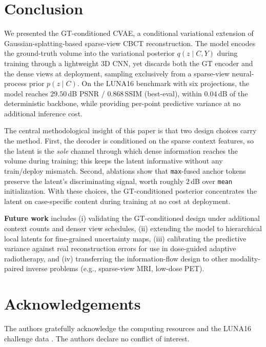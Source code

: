 
\section{Conclusion}
\label{sec:conclusion}

We presented the GT-conditioned CVAE, a conditional variational
extension of Gaussian-splatting-based sparse-view CBCT reconstruction.
The model encodes the ground-truth volume into the variational posterior
$q(z\mid C,Y)$ during training through a lightweight 3D CNN, yet
discards both the GT encoder and the dense views at deployment,
sampling exclusively from a sparse-view neural-process prior
$p(z\mid C)$. On the LUNA16 benchmark with six projections, the model
reaches $29.50$\,dB PSNR / $0.868$\,SSIM (best-eval), within $0.04$\,dB
of the deterministic backbone, while providing per-point predictive
variance at no additional inference cost.

The central methodological insight of this paper is that two design
choices carry the method. First, the decoder is conditioned on the
sparse context features, so the latent is the \emph{sole} channel
through which dense information reaches the volume during training;
this keeps the latent informative without any train/deploy mismatch.
Second, ablations show that \texttt{max}-fused anchor tokens preserve
the latent's discriminating signal, worth roughly $2$\,dB over
\texttt{mean} initialization. With these choices, the GT-conditioned
posterior concentrates the latent on case-specific content during
training at no cost at deployment.

\textbf{Future work} includes (i) validating the GT-conditioned design
under additional context counts and denser view schedules,
(ii) extending the model to hierarchical local latents for fine-grained
uncertainty maps, (iii) calibrating the predictive variance against
real reconstruction errors for use in dose-guided adaptive
radiotherapy, and (iv) transferring the information-flow design to other
modality-paired inverse problems (e.g., sparse-view MRI, low-dose PET).

\section*{Acknowledgements}

The authors gratefully acknowledge the computing resources and the
LUNA16 challenge data \cite{setio2017luna16}. The authors declare no
conflict of interest.